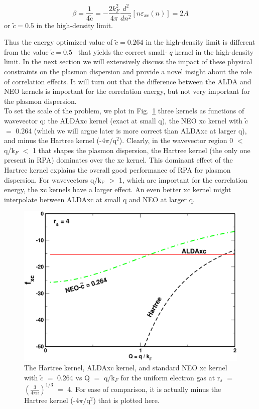\documentclass[aps,amsmath,amssymb, preprint, 12pt]{revtex4-1}
\begin{document}
\begin{equation}
 \beta =\frac{1}{4\widetilde{\text{c}}}   =-\frac{2k_{F}^2}{4 \pi }\frac{d^{2}}{dn^{2}} [ n \varepsilon _{xc} ( n )  ] = 2A
\end{equation}
or   \( \widetilde{c}=0.5 \)  in the high-density limit.

Thus the energy optimized value of  \( \widetilde{c}=0.264 \)  in the high-density limit is different from the value  \( \widetilde{c}=0.5 \) \  that yields the correct small- \( q \)  kernel in the high-density limit. In the next section we will extensively discuss the impact of these physical constraints on the plasmon dispersion and provide a novel insight about the role of correlation effects. It will turn out that the difference between the ALDA and NEO kernels is important for the correlation energy, but not very important for the plasmon dispersion.\\

To set the scale of the problem, we plot in Fig.~\ref{fig0} three kernels as functions of wavevector q: the ALDAxc kernel (exact at small q), the NEO xc kernel with $\widetilde{c}$ $=$ 0.264 (which we will argue later is more correct than ALDAxc at larger q), and minus the Hartree kernel (-4$\pi/\text{q}^2$). Clearly, in the wavevector region 0 $<$ q/k$_F$ $<$ 1 that shapes the plasmon dispersion, the Hartree kernel (the only one present in RPA) dominates over the xc kernel. This dominant effect of the Hartree kernel explains the overall good performance of RPA for plasmon dispersion. For wavevectors q/k$_\text{F}$ $>$ 1, which are important for the correlation energy, the xc kernels have a larger effect. An even better xc kernel might interpolate between ALDAxc at small q and NEO at larger q.

\begin{figure}[h!]
	\includegraphics[scale=0.4]{figure_0.pdf}
	\caption{The Hartree kernel, ALDAxc kernel, and standard NEO xc kernel with $\widetilde{c}$ $=$ 0.264 vs Q $=$ q/k$_F$ for the uniform electron gas at r$_s$ $=$ $(\frac{3}{4\pi n})^{1/3}$ $=$ 4. For ease of comparison, it is actually minus the Hartree kernel (-4$\pi/\text{q}^2$) that is plotted here.}
	\label{fig0}
\end{figure}
\end{document}
